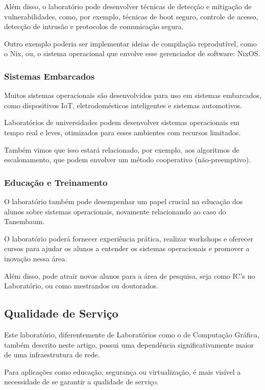 Além disso, o laboratório pode desenvolver técnicas de detecção e
mitigação de vulnerabilidades, como, por exemplo, técnicas de boot
seguro, controle de acesso, detecção de intrusão e protocolos de
comunicação segura.

Outro exemplo poderia ser implementar ideias de compilação reprodutível,
como o Nix, ou, o sistema operacional que envolve esse gerenciador
de software: NixOS.

\subsubsection{Sistemas Embarcados}

Muitos sistemas operacionais são desenvolvidos para uso em sistemas
embarcados, como dispositivos IoT, eletrodomésticos inteligentes e
sistemas automotivos.

Laboratórios de universidades podem desenvolver sistemas operacionais
em tempo real e leves, otimizados para esses ambientes com recursos
limitados.

Também vimos que isso estará relacionado, por exemplo, aos algoritmos
de escalonamento, que podem envolver um método cooperativo (não-preemptivo).

\subsubsection{Educação e Treinamento}

O laboratório também pode desempenhar um papel crucial na educação
dos alunos sobre sistemas operacionais, novamente relacionando ao caso
do Tanembaum.

O laboratório poderá fornecer experiência prática, realizar workshops
e oferecer cursos para ajudar os alunos a entender os sistemas operacionais
e promover a inovação nessa área.

Além disso, pode atrair novos alunos para a área de pesquisa, seja
como IC's no Laboratório, ou como mestrandos ou doutorados.

\newpage
\subsection{Qualidade de Serviço}

Este laboratório, diferentemente de Laboratórios como o de Computação Gráfica,
também descrito neste artigo, possui uma dependência significativamente
maior de uma infraestrutura de rede.

Para aplicações como educação, segurança ou virtualização, é mais
visível a necessidade de se garantir a qualidade de serviço.

